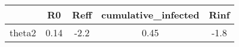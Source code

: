 \begin{tabular}{|c|c|c|c|c|}
\hline
& R0 & Reff & cumulative_infected & Rinf \\
\hline
theta2 & 0.14 & -2.2 & 0.45 & -1.8 \\
\hline
\end{tabular}
